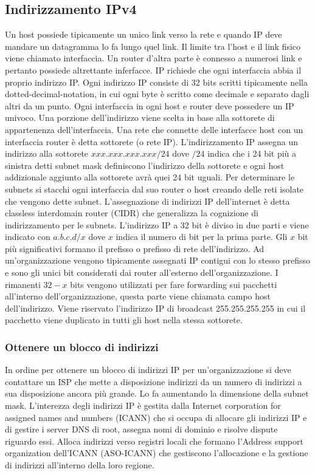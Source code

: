 \subsection{Indirizzamento IPv4}
Un host possiede tipicamente un unico link verso la rete e quando IP deve mandare un datagramma lo fa lungo quel link. Il limite tra l'host e il link fisico
viene chiamato interfaccia. Un router d'altra parte \`e connesso a numerosi link e pertanto possiede altrettante inferfacce. IP richiede che ogni 
interfaccia abbia il proprio indirizzo IP. Ogni indirizzo IP consiste di 32 bits scritti tipicamente nella dotted-decimal-notation, in cui ogni byte \`e 
scritto come decimale e separato dagli altri da un punto. Ogni interfaccia in ogni host e router deve possedere un IP univoco. Una porzione dell'indirizzo
viene scelta in base alla sottorete di appartenenza dell'interfaccia. Una rete che connette delle interfacce host con un interfaccia router \`e detta
sottorete (o rete IP). L'indirizzamento IP assegna un indirizzo alla sottorete $xxx.xxx.xxx.xxx/24$ dove $/24$ indica che i 24 bit pi\`u a sinistra detti
subnet mask definiscono l'indirizzo della sottorete e ogni host addizionale aggiunto alla sottorete avr\`a quei 24 bit uguali. Per determinare le subnets
si stacchi ogni interfaccia dal suo router o host creando delle reti isolate che vengono dette subnet. L'assegnazione di indirizzi IP dell'internet \`e
detta classless interdomain router (CIDR) che generalizza la cognizione di indirizzamento per le subnets. L'indirizzo IP a 32 bit \`e diviso in due 
parti e viene indicato con $a.b.c.d/x$ dove $x$ indica il numero di bit per la prima parte. Gli $x$ bit pi\`u significativi formano il prefisso o prefisso
di rete dell'indirizzo. Ad un'organizzazione vengono tipicamente assegnati IP contigui con lo stesso prefisso e sono gli unici bit considerati dai router
all'esterno dell'organizzazione. I rimanenti $32-x$ bits vengono utilizzati per fare forwarding sui pacchetti all'interno dell'organizzazione, questa parte viene chiamata campo host dell'indirizzo. Viene 
riservato l'indirizzo IP di broadcast 255.255.255.255 in cui il pacchetto viene duplicato in tutti gli host nella stessa sottorete. 
\subsubsection{Ottenere un blocco di indirizzi}
In ordine per ottenere un blocco di indirizzi IP per un'organizzazione si deve contattare un ISP che mette a disposizione indirizzi da un numero di 
indirizzi a sua disposizione ancora pi\`u grande. Lo fa aumentando la dimensione della subnet mask. L'interezza degli indirizzi IP \`e gestita dalla 
Internet corporation for assigned names and numbers (ICANN) che si occupa di allocare gli indirizzi IP e di gestire i server DNS di root, assegna nomi di 
dominio e risolve dispute riguardo essi. Alloca indirizzi verso registri locali che formano l'Address support organization dell'ICANN (ASO-ICANN) che 
gestiscono l'allocazione e la gestione di indirizzi all'interno della loro regione. 
